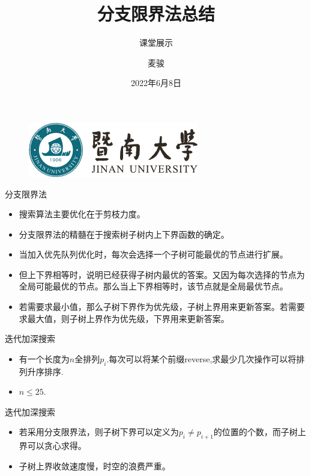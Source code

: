 \documentclass{beamer}
\author{麦骏}
\title{分支限界法总结}
\subtitle{课堂展示}
\institute{信息科学技术学院}
\date{2022年6月8日}
\begin{document}
    
    \kaishu
    \begin{frame}
        \titlepage
        \begin{figure}[htpb]
            \begin{center}
                \includegraphics[width=0.4\linewidth]{pic/jnu.png}
            \end{center}
        \end{figure}
    \end{frame}

    \begin{frame}{分支限界法}
        \begin{itemize}
            \item 搜索算法主要优化在于剪枝力度。
            \item 分支限界法的精髓在于搜索树子树内上下界函数的确定。
            \item 当加入优先队列优化时，每次会选择一个子树可能最优的节点进行扩展。
            \item 但上下界相等时，说明已经获得子树内最优的答案。又因为每次选择的节点为全局可能最优的节点。那么当上下界相等时，该节点就是全局最优节点。
            \item 若需要求最小值，那么子树下界作为优先级，子树上界用来更新答案。若需要求最大值，则子树上界作为优先级，下界用来更新答案。
        \end{itemize}
    \end{frame}

    \begin{frame}{迭代加深搜索}
        \begin{itemize}
            \item 有一个长度为$n$全排列$p_i$.每次可以将某个前缀reverse,求最少几次操作可以将排列升序排序.
            \item $n \leq 25$.
        \end{itemize}
    \end{frame}
    
    \begin{frame}{迭代加深搜索}
        \begin{itemize}
            \item 若采用分支限界法，则子树下界可以定义为$p_i \neq p_{i+1}$的位置的个数，而子树上界可以贪心求得。
            \item 子树上界收敛速度慢，时空的浪费严重。
        \end{itemize}
    \end{frame}
    
\end{document}
